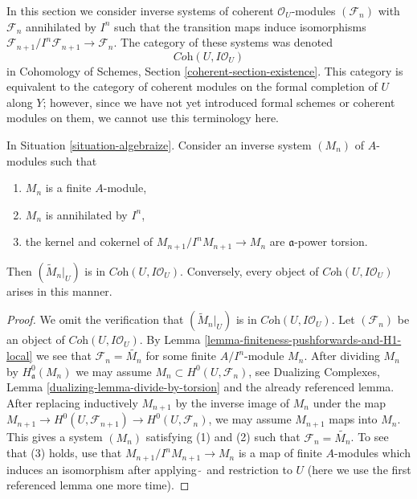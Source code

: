 \noindent
In this section we consider inverse systems of coherent
$\mathcal{O}_U$-modules $(\mathcal{F}_n)$ with $\mathcal{F}_n$
annihilated by $I^n$ such that the transition maps induce
isomorphisms $\mathcal{F}_{n + 1}/I^n\mathcal{F}_{n + 1} \to \mathcal{F}_n$.
The category of these systems was denoted
$$
\textit{Coh}(U, I\mathcal{O}_U)
$$
in Cohomology of Schemes, Section \ref{coherent-section-existence}.
This category is equivalent to the category of coherent modules
on the formal completion of $U$ along $Y$; however, since we have
not yet introduced formal schemes or coherent modules on them,
we cannot use this terminology here.

\begin{lemma}
\label{lemma-system-of-modules}
In Situation \ref{situation-algebraize}.
Consider an inverse system $(M_n)$ of $A$-modules such
that
\begin{enumerate}
\item $M_n$ is a finite $A$-module,
\item $M_n$ is annihilated by $I^n$,
\item the kernel and cokernel of $M_{n + 1}/I^nM_{n + 1} \to M_n$
are $\mathfrak a$-power torsion.
\end{enumerate}
Then $(\widetilde{M}_n|_U)$ is in $\textit{Coh}(U, I\mathcal{O}_U)$.
Conversely, every object of $\textit{Coh}(U, I\mathcal{O}_U)$
arises in this manner.
\end{lemma}

\begin{proof}
We omit the verification that $(\widetilde{M}_n|_U)$ is in
$\textit{Coh}(U, I\mathcal{O}_U)$. Let $(\mathcal{F}_n)$
be an object of $\textit{Coh}(U, I\mathcal{O}_U)$.
By Lemma \ref{lemma-finiteness-pushforwards-and-H1-local}
we see that $\mathcal{F}_n = \widetilde{M_n}$ for some finite
$A/I^n$-module $M_n$. After dividing $M_n$ by $H^0_\mathfrak a(M_n)$
we may assume $M_n \subset H^0(U, \mathcal{F}_n)$, see
Dualizing Complexes, Lemma \ref{dualizing-lemma-divide-by-torsion}
and the already referenced lemma.
After replacing inductively $M_{n + 1}$ by the inverse image
of $M_n$ under the map $M_{n + 1} \to H^0(U, \mathcal{F}_{n + 1})
\to H^0(U, \mathcal{F}_n)$, we may assume $M_{n + 1}$ maps into
$M_n$. This gives a system $(M_n)$ satisfying (1) and (2)
such that $\mathcal{F}_n = \widetilde{M_n}$. To see that (3)
holds, use that $M_{n + 1}/I^nM_{n + 1} \to M_n$ is a map
of finite $A$-modules which induces an isomorphism after
applying $\widetilde{\ }$ and restriction to $U$
(here we use the first referenced lemma one more time).
\end{proof}

